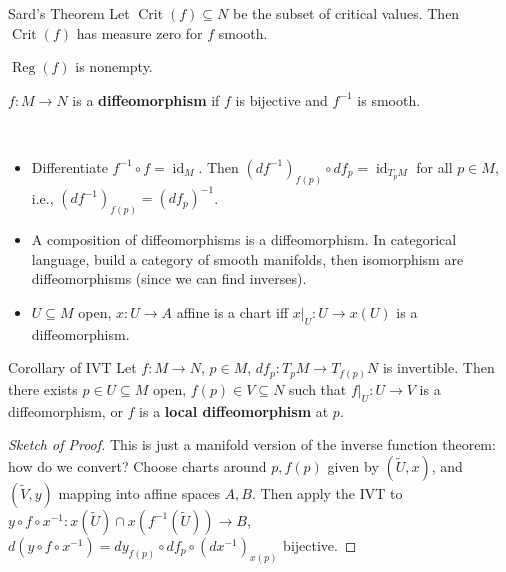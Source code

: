 \begin{namedthm}{Sard's Theorem}
    Let $\operatorname{Crit}(f) \subseteq N$ be the subset of critical values. Then $\operatorname{Crit}(f)$ has measure zero for $f$ smooth.
\end{namedthm}
\begin{cor}
    $\operatorname{Reg}(f)$ is nonempty.
\end{cor}
\begin{definition}[]
    $f \colon M \to N$ is a \textbf{diffeomorphism} if $f$ is bijective and $f ^{-1}$ is smooth.
\end{definition}
\begin{remark}\,
    \begin{itemize}
        \item Differentiate $f^{-1} \circ f=\operatorname{id}_M$. Then $(df^{-1})_{f(p)}\circ df_p= \operatorname{id}_{T_pM}$ for all $p \in M$, i.e., $(df^{-1})_{f(p)}=(df_p)^{-1}$. 
        \item A composition of diffeomorphisms is a diffeomorphism. In categorical language, build a category of smooth manifolds, then isomorphism are diffeomorphisms (since we can find inverses).
        \item $U \subseteq M$ open, $x \colon U \to A$ affine is a chart iff $x|_U \colon U \to x(U)$ is a diffeomorphism.
    \end{itemize}
\end{remark}

\begin{namedthm}{Corollary of IVT}
    Let $f \colon M \to N$, $p \in M$, $df_p \colon T_pM \to T_{f(p)}N$ is invertible. Then there exists $p \in U \subseteq M$ open, $f(p) \in V \subseteq N$ such that $f|_U \colon U \to V$ is a diffeomorphism, or $f$ is a \textbf{local diffeomorphism} at $p$.
\end{namedthm}
\begin{proof}[Sketch of Proof]
    This is just a manifold version of the inverse function theorem: how do we convert? Choose charts around $p, f(p)$ given by $(\widetilde U, x)$, and $(\widetilde V, y)$ mapping into affine spaces $A,B$. Then apply the IVT to $y \circ f \circ x^{-1} \colon x(\widetilde U) \cap x(f ^{-1}(\widetilde U)) \to B$, $d(y \circ f \circ x ^{-1})=dy _{f(p)}\circ df_p \circ (dx^{-1})_{x(p)}$ bijective.
\end{proof}

